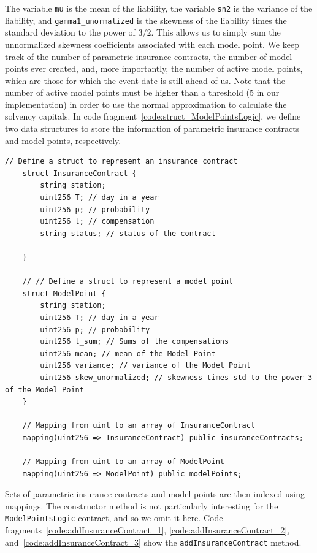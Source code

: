 \documentclass[10pt]{article}
\begin{document}
The variable \texttt{mu} is the mean of the liability, the variable \texttt{sn2} is the variance of the liability, and \texttt{gamma1\_unormalized} is the skewness of the liability times the standard deviation to the power of $3/2$. This allows us to simply sum the unnormalized skewness coefficients associated with each model point. We keep track of the number of parametric insurance contracts, the number of model points ever created, and, more importantly, the number of active model points, which are those for which the event date is still ahead of us. Note that the number of active model points must be higher than a threshold (5 in our implementation) in order to use the normal approximation to calculate the solvency capitals. In code fragment~\ref{code:struct_ModelPointsLogic}, we define two data structures to store the information of parametric insurance contracts and model points, respectively.
 

\begin{codefragment}[!h]
\begin{lstlisting}[language=Solidity]
    // Define a struct to represent an insurance contract
    struct InsuranceContract {
        string station;
        uint256 T; // day in a year
        uint256 p; // probability
        uint256 l; // compensation
        string status; // status of the contract

    }

    // // Define a struct to represent a model point
    struct ModelPoint {
        string station;
        uint256 T; // day in a year
        uint256 p; // probability
        uint256 l_sum; // Sums of the compensations
        uint256 mean; // mean of the Model Point
        uint256 variance; // variance of the Model Point
        uint256 skew_unormalized; // skewness times std to the power 3 of the Model Point
    }

    // Mapping from uint to an array of InsuranceContract
    mapping(uint256 => InsuranceContract) public insuranceContracts;

    // Mapping from uint to an array of ModelPoint
    mapping(uint256 => ModelPoint) public modelPoints;
\end{lstlisting}
    \caption{Data structures of the \texttt{ModelPointsLogic} contract.}
    \label{code:struct_ModelPointsLogic}
\end{codefragment}

Sets of parametric insurance contracts and model points are then indexed using mappings. The constructor method is not particularly interesting for the \texttt{ModelPointsLogic} contract, and so we omit it here. Code fragments~\ref{code:addInsuranceContract_1}, \ref{code:addInsuranceContract_2}, and~\ref{code:addInsuranceContract_3} show the \texttt{addInsuranceContract} method.
\end{document}
